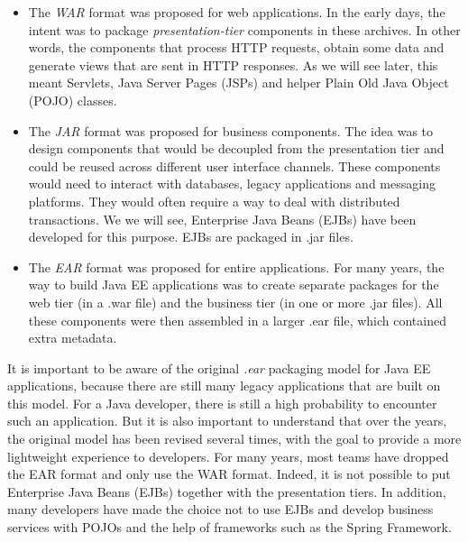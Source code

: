 \begin{itemize}
\item The \emph{WAR} format was proposed for web applications. In the early days, the intent was to package \emph{presentation-tier} components in these archives. In other words, the components that process HTTP requests, obtain some data and generate views that are sent in HTTP responses. As we will see later, this meant Servlets, Java Server Pages (JSPs) and helper Plain Old Java Object (POJO) classes. 
\item The \emph{JAR} format was proposed for business components. The idea was to design components that would be decoupled from the presentation tier and could be reused across different user interface channels. These components would need to interact with databases, legacy applications and messaging platforms. They would often require a way to deal with distributed transactions. We we will see, Enterprise Java Beans (EJBs) have been developed for this purpose. EJBs are packaged in .jar files.
\item The \emph{EAR} format was proposed for entire applications. For many years, the way to build Java EE applications was to create separate packages for the web tier (in a .war file) and the business tier (in one or more .jar files). All these components were then assembled in a larger .ear file, which contained extra metadata.
\end{itemize}


It is important to be aware of the original \emph{.ear} packaging model for Java EE applications, because there are still many legacy applications that are built on this model. For a Java developer, there is still a high probability to encounter such an application. But it is also important to understand that over the years, the original model has been revised several times, with the goal to provide a more lightweight experience to developers. For many years, most teams have dropped the EAR format and only use the WAR format. Indeed, it is not possible to put Enterprise Java Beans (EJBs) together with the presentation tiers. In addition, many developers have made the choice not to use EJBs and develop business services with POJOs and the help of frameworks such as the Spring Framework.

